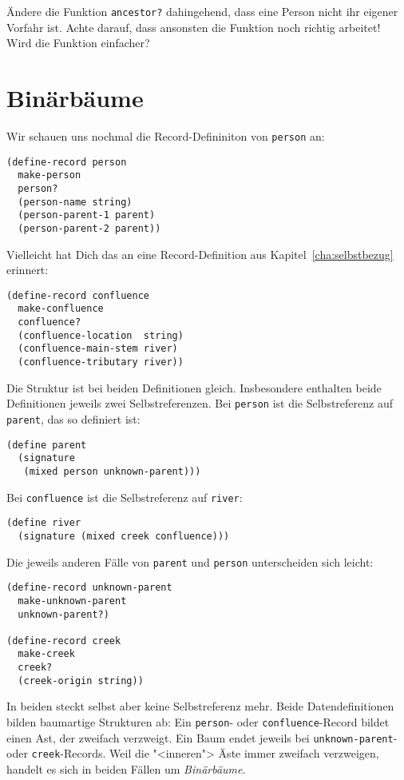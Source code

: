 \begin{aufgabeinline}
  Ändere die Funktion \lstinline{ancestor?} dahingehend, dass eine
  Person nicht ihr eigener Vorfahr ist.
  Achte darauf, dass ansonsten die Funktion noch richtig arbeitet!
  Wird die Funktion einfacher?
\end{aufgabeinline}

\section{Binärbäume}
\label{sec:trees}

Wir schauen uns nochmal die Record-Defininiton von \lstinline{person}
an:
%
\begin{lstlisting}
(define-record person
  make-person
  person?
  (person-name string)
  (person-parent-1 parent)
  (person-parent-2 parent))
\end{lstlisting}
%
Vielleicht hat Dich das an eine Record-Definition aus
Kapitel~\ref{cha:selbstbezug} erinnert:
%
\begin{lstlisting}
(define-record confluence
  make-confluence
  confluence?
  (confluence-location  string)
  (confluence-main-stem river)
  (confluence-tributary river))
\end{lstlisting}
%
Die Struktur ist bei beiden Definitionen gleich.  Insbesondere
enthalten beide Definitionen jeweils zwei Selbstreferenzen.  Bei
\lstinline{person} ist die Selbstreferenz auf \lstinline{parent}, das
so definiert ist:
%
\begin{lstlisting}
(define parent
  (signature
   (mixed person unknown-parent)))
\end{lstlisting}
% 
Bei \lstinline{confluence} ist die Selbstreferenz auf
\lstinline{river}:
%
\begin{lstlisting}
(define river
  (signature (mixed creek confluence)))
\end{lstlisting}
%
Die jeweils anderen Fälle von \lstinline{parent} und
\lstinline{person} unterscheiden sich leicht:
%
\begin{lstlisting}
(define-record unknown-parent
  make-unknown-parent
  unknown-parent?)

(define-record creek
  make-creek
  creek?
  (creek-origin string))
\end{lstlisting}
%
In beiden steckt selbst aber keine Selbstreferenz mehr.  Beide
Datendefinitionen bilden baumartige Strukturen ab: Ein
\lstinline{person}- oder \lstinline{confluence}-Record bildet einen
Ast, der zweifach verzweigt.  Ein Baum endet jeweils bei
\lstinline{unknown-parent}- oder \lstinline{creek}-Records.  Weil die
"<inneren"> Äste immer zweifach verzweigen, handelt es sich in beiden
Fällen um \textit{Binärbäume}.  

